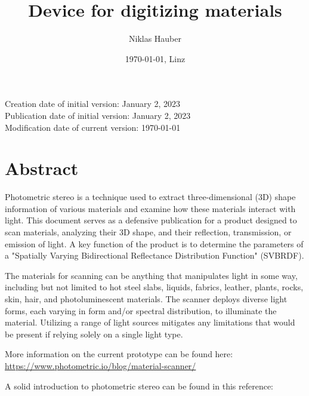 \documentclass[11pt, twoside, listof=totocnumbered, bibliography=totocnumbered]{scrartcl}
\title{Device for digitizing materials}
\author{Niklas Hauber}
\date{\today{}, Linz}
\begin{document}
\maketitle
Creation date of initial version: January 2, 2023\\
Publication date of initial version: January 2, 2023\\
Modification date of current version: \today{}\\

\section{Abstract}
Photometric stereo is a technique used to extract three-dimensional (3D) shape information of various materials and examine how these materials interact with light. This document serves as a defensive publication for a product designed to scan materials, analyzing their 3D shape, and their reflection, transmission, or emission of light. A key function of the product is to determine the parameters of a "Spatially Varying Bidirectional Reflectance Distribution Function" (SVBRDF).

The materials for scanning can be anything that manipulates light in some way, including but not limited to hot steel slabs, liquids, fabrics, leather, plants, rocks, skin, hair, and photoluminescent materials. The scanner deploys diverse light forms, each varying in form and/or spectral distribution, to illuminate the material. Utilizing a range of light sources mitigates any limitations that would be present if relying solely on a single light type. \cite{SURVEY}

More information on the current prototype can be found here: \\
\href{https://www.photometric.io/blog/material-scanner/}{https://www.photometric.io/blog/material-scanner/}

A solid introduction to photometric stereo can be found in this reference: \cite{SURVEY}
\end{document}
